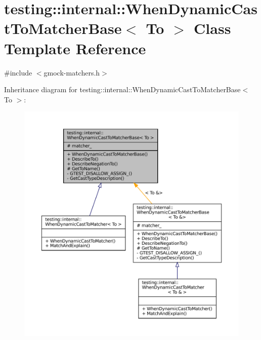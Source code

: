 \hypertarget{classtesting_1_1internal_1_1WhenDynamicCastToMatcherBase}{}\section{testing\+:\+:internal\+:\+:When\+Dynamic\+Cast\+To\+Matcher\+Base$<$ To $>$ Class Template Reference}
\label{classtesting_1_1internal_1_1WhenDynamicCastToMatcherBase}


{\ttfamily \#include $<$gmock-\/matchers.\+h$>$}



Inheritance diagram for testing\+:\+:internal\+:\+:When\+Dynamic\+Cast\+To\+Matcher\+Base$<$ To $>$\+:
\nopagebreak
\begin{figure}[H]
\begin{center}
\leavevmode
\includegraphics[width=350pt]{classtesting_1_1internal_1_1WhenDynamicCastToMatcherBase__inherit__graph}
\end{center}
\end{figure}


